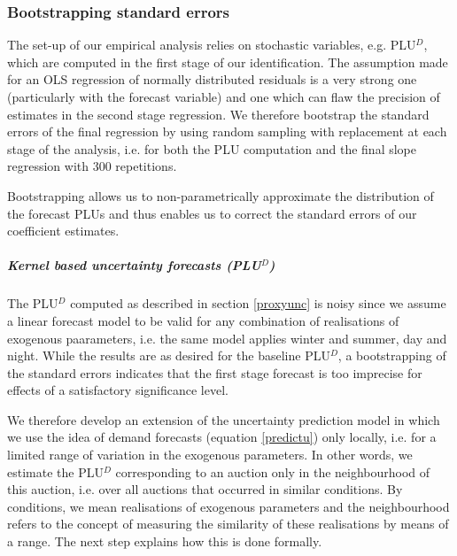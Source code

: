 \subsubsection{Bootstrapping standard errors}
The set-up of our empirical analysis relies on stochastic variables, e.g. PLU$^D$, which are computed in the first stage of our identification. The assumption made for an OLS regression of normally distributed residuals is a very strong one (particularly with the forecast variable) and one which can flaw the precision of estimates in the second stage regression. 
We therefore bootstrap the standard errors of the final regression by using random sampling with replacement at each stage of the analysis, i.e. for both the PLU computation and the final slope regression  with 300 repetitions. %

Bootstrapping allows us to non-parametrically approximate the distribution of the forecast PLUs and thus enables us to correct the standard errors of our coefficient estimates. 

\subparagraph{Kernel based uncertainty forecasts (PLU$^D$)}
\label{robustunc}

The PLU$^D$ computed as described in section \ref{proxyunc} is noisy since we assume a linear forecast model to be valid for any combination of realisations of exogenous paarameters, i.e. the same model applies winter and summer, day and night. 
While the results are as desired for the baseline PLU$^D$, a bootstrapping of the standard errors indicates that the first stage forecast is too imprecise for effects of a satisfactory significance level. 

We therefore develop an extension of the uncertainty prediction model  in which we use the idea of demand forecasts (equation \ref{predictu}) only locally, i.e. for a limited range of variation in the exogenous parameters. In other words, we estimate the PLU$^D$ corresponding to an auction only in the neighbourhood of this auction, i.e. over all auctions that occurred in similar conditions. By conditions, we mean realisations of exogenous parameters and the neighbourhood refers to the concept of measuring the similarity of these realisations by means of a range. The next step explains how this is done formally. 

